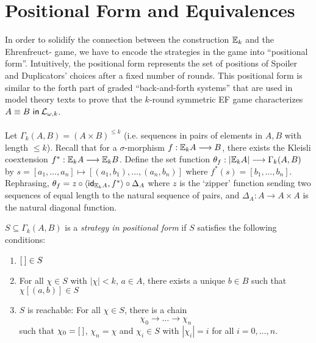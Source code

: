 \section{Positional Form and Equivalences}\label{sec:positionalFormEF}
In order to solidify the connection between the construction ${\mathbb{E}_{k}}$ and the Ehrenfreuct-{\Fraisse} game, we have to encode the strategies in the game into ``positional form''. Intuitively, the positional form represents the set of positions of Spoiler and Duplicators' choices after a fixed number of rounds. This positional form is similar to the forth part of graded ``back-and-forth systems'' that are used in model theory texts to prove that the $k$-round symmetric EF game characterizes ${A \equiv B \ \mathsf{in}\: \mathcal{L}_{\omega,k}}$. \\~\\
Let $\Gamma_{k}(A,B) = (A \times B)^{\leq k}$ (i.e. sequences in pairs of elements in $A,B$ with length $\leq k$). Recall that for a $\sigma$-morphism $f:{\mathbb{E}_{k}A} \longrightarrow B$, there exists the Kleisli coextension $f^{*}:{\mathbb{E}_{k}A} \longrightarrow {\mathbb{E}_{k}B}$. Define the set function $\theta_{f}:|{\mathbb{E}_{k}A}| \longrightarrow \Gamma_{k}(A,B)$ by $s = [a_{1},\dots,a_{n}] \mapsto [(a_{1},b_{1}),\dots,(a_{n},b_{n})]$ where $f^{*}(s) = [b_{1},\dots,b_{n}]$. Rephrasing, $\theta_{f} = z \circ \langle \mathsf{id}_{{\mathbb{E}_{k}A}},f^{*} \rangle \circ \Delta_{A}$ where $z$ is the `zipper' function sending two sequences of equal length to the natural sequence of pairs, and $\Delta_{A}:A \longrightarrow A \times A$ is the natural diagonal function.  
\begin{defn}
$S \subseteq \Gamma_{k}(A,B)$ is a \textit{strategy in positional form} if $S$ satisfies the following conditions:
\begin{enumerate}[label=(S\arabic*),ref=S\arabic*,start=0]
\item ${[\:]} \in S$ \label{eq:S1st}
\item For all $\chi \in S$ with $|\chi| < k$, $a \in A$, there exists a unique $b \in B$ such that $\chi[(a,b)] \in S$ \label{eq:S2nd}
\item $S$ is reachable: For all $\chi \in S$, there is a chain \label{eq:S3rd}
$$\chi_{0} \longrightarrow \dots \longrightarrow \chi_{n}$$
such that $\chi_{0} = {[\:]}$, $\chi_{n} = \chi$ and $\chi_{i} \in S$ with $|\chi_{i}| = i$ for all $i = 0,\dots,n$. 
\end{enumerate}
\end{defn}
